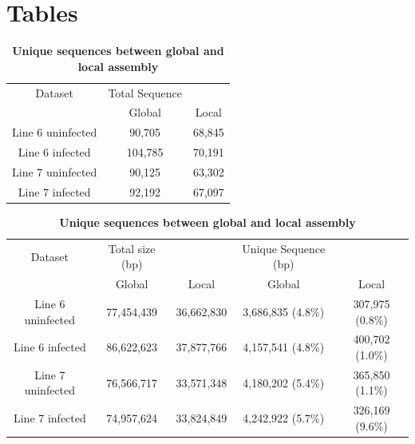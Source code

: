 \documentclass[10pt]{article}
\begin{document}


\section*{Tables}
\begin{table}[!ht]

\caption{
\bf{Total unique sequences from global and local assembly (k=$21-31$)}}
\begin{tabular}{ccc}
\hline
Dataset & Total Sequence & \\
        & Global & Local \\
\hline
Line 6 uninfected & 90,705 & 68,845\\
Line 6 infected & 104,785 & 70,191 \\
Line 7 uninfected & 90,125 & 63,302\\
Line 7 infected &  92,192 & 67,097 \\
\hline
\end{tabular}
\label{total_sequences}

\caption{
\bf{Unique sequences between global and local assembly}}
\begin{tabular}{ccccc}
\hline
Dataset & Total size (bp) & & Unique Sequence (bp) & \\
        & Global & Local & Global & Local\\
\hline
Line 6 uninfected & 77,454,439 & 36,662,830 & 3,686,835 (4.8\%) & 307,975 (0.8\%)\\
Line 6 infected & 86,622,623 & 37,877,766 & 4,157,541 (4.8\%)& 400,702 (1.0\%)\\
Line 7 uninfected & 76,566,717 & 33,571,348 & 4,180,202 (5.4\%) & 365,850 (1.1\%)\\
Line 7 infected & 74,957,624 & 33,824,849 & 4,242,922 (5.7\%)& 326,169 (9.6\%)\\
\hline
\end{tabular}
\label{unique_sequences}


\end{table}
\end{document}

